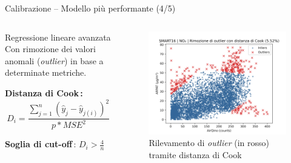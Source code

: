 \begin{frame}{Calibrazione – Modello più performante (4/5)}

\begin{columns}
\hspace{0.3cm}\begin{column}{0.45\textwidth}

\begin{block}{Regressione lineare avanzata}
Con rimozione dei valori anomali (\textit{outlier}) in base a determinate metriche.\vspace{0.2cm}

\textbf{Distanza di Cook\,\footnotemark:}
$$D_{i}=\frac{\sum_{j=1}^{n}\left(\hat{y}_{j}-\hat{y}_{j(i)}\right)^{2}}{p  * MSE^{2}}$$

\textbf{Soglia di cut-off\,\footnotemark}:
$D_{i}>\frac{4}{n}$

\vspace{0.1cm}
\end{block}
\end{column}

\hspace{0.1cm}\begin{column}{0.53\textwidth}

\begin{center}
\begin{figure}[H]
\centering
\captionsetup{justification=centering}
\includegraphics[width=\textwidth]{images/cook_no2.png}
\caption{Rilevamento di \textit{outlier} (in rosso) tramite distanza di Cook}
\end{figure}
\end{center}

\end{column}

\let\oldfootnotesize\footnotesize
\renewcommand*{\footnotesize}{\oldfootnotesize\tiny}
\addtocounter{footnote}{-1}
\addtocounter{footnote}{1}

\end{columns}

\end{frame}

